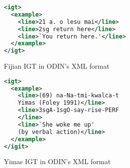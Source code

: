 \begin{figure}[t]
\small
\begin{lstlisting}[language=XML]
<igt>
  <example>
    <line>21 a. o lesu mai</line>
    <line>2sg return here</line>
    <line>`You return here.'</line>
  </example>
</igt>
\end{lstlisting} 
\caption{Fijian IGT in ODIN's XML format} \label{fig:odin_fijian_xml}
\end{figure}


\begin{figure}[t]
\small
\begin{lstlisting}[language=XML]
<igt>
  <example>
    <line>(69) na-Na-tmi-kwalca-t 
    Yimas (Foley 1991)</line>
    <line>3sgA-1sgO-say-rise-PERF
    </line>
    <line>`She woke me up' 
    (by verbal action)</line>
  </example>
</igit>
\end{lstlisting} 
\smallskip
\caption{Yimas IGT in ODIN's XML format}\label{fig:odin_yimas_xml}
\end{figure}





